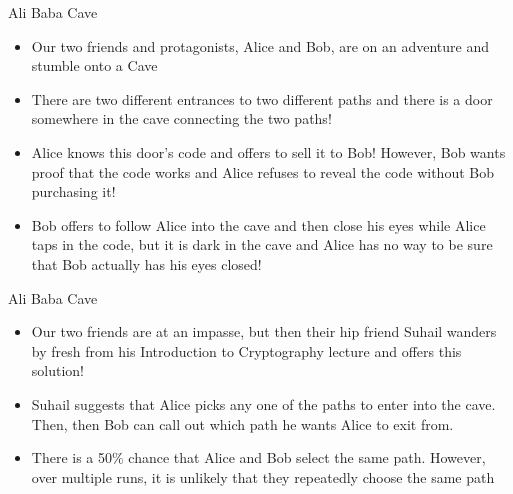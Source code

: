 \documentclass[handout]{beamer}
\begin{document}
\begin{frame}{Ali Baba Cave}
    \begin{itemize}
        \item \pause Our two friends and protagonists, Alice and Bob, are on an adventure and stumble onto a Cave
        \item \pause There are two different entrances to two different paths and there is a door somewhere in the cave connecting the two paths!
        \item \pause Alice knows this door's code and offers to sell it to Bob! However, Bob wants proof that the code works and Alice refuses to reveal the code without Bob purchasing it!
        \item \pause Bob offers to follow Alice into the cave and then close his eyes while Alice taps in the code, but it is dark in the cave and Alice has no way to be sure that Bob actually has his eyes closed!
    \end{itemize}
\end{frame}

\begin{frame}{Ali Baba Cave}
    \begin{itemize}
        \item \pause Our two friends are at an impasse, but then their hip friend Suhail wanders by fresh from his Introduction to Cryptography lecture and offers this solution! 
        \item \pause Suhail suggests that Alice picks any one of the paths to enter into the cave. Then, then Bob can call out which path he wants Alice to exit from.
        \item \pause There is a 50\% chance that Alice and Bob select the same path. However, over multiple runs, it is unlikely that they repeatedly choose the same path
    \end{itemize}
\end{frame}
\end{document}
